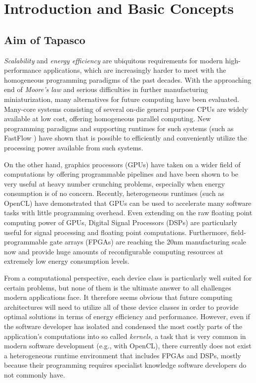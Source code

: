 \section{Introduction and Basic Concepts}\label{sec:overview}%
%
\subsection*{Aim of Tapasco}
\emph{Scalability} and \emph{energy efficiency} are ubiquitous requirements for modern high-performance applications, which are increasingly harder to meet with the homogeneous programming paradigms of the past decades.
With the approaching end of \emph{Moore's law} and serious difficulties in further manufacturing miniaturization, many alternatives for future computing have been evaluated.
Many-core systems consisting of several on-die general purpose CPUs are widely available at low cost, offering homogeneous parallel computing.
New programming paradigms and supporting runtimes for such systems (such as FastFlow \cite{fastflow}) have shown that is possible to efficiently and conveniently utilize the processing power available from such systems.

\medskip
On the other hand, graphics processors (GPUs) have taken on a wider field of computations by offering programmable pipelines and have been shown to be very useful at heavy number crunching problems, especially when energy consumption is of no concern.
Recently, heterogeneous runtimes (such as OpenCL) have demonstrated that GPUs can be used to accelerate many software tasks with little programming overhead.
Even extending on the raw floating point computing power of GPUs, Digital Signal Processors (DSPs) are particularly useful for signal processing and floating point computations.
Furthermore, field-programmable gate arrays (FPGAs) are reaching the 20nm manufacturing scale now and provide huge amounts of reconfigurable computing resources at extremely low energy consumption levels.

\medskip
From a computational perspective, each device class is particularly well suited for certain problems, but none of them is the ultimate answer to all challenges modern applications face.
It therefore seems obvious that future computing architectures will need to utilize all of these device classes in order to provide optimal solutions in terms of energy efficiency and performance.
However, even if the software developer has isolated and condensed the most costly parts of the application's computations into so called \emph{kernels}, a task that is very common in modern software development (e.g., with OpenCL), there currently does not exist a heterogeneous runtime environment that includes FPGAs and DSPs, mostly because their programming requires specialist knowledge software developers do not commonly have.

